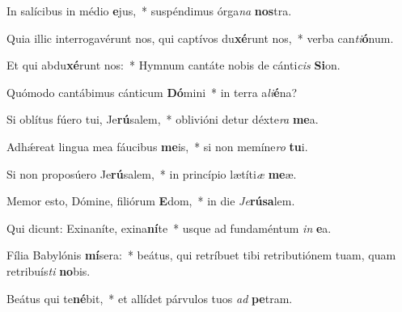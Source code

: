 \item In salícibus in médio \textbf{e}jus,~* suspéndimus órga\textit{na} \textbf{nos}tra.
\item Quia illic interrogavérunt nos, qui captívos du\textbf{xé}runt nos,~* verba can\textit{ti}\textbf{ó}num.
\item Et qui abdu\textbf{xé}runt nos:~* Hymnum cantáte nobis de cánti\textit{cis} \textbf{Si}on.
\item Quómodo cantábimus cánticum \textbf{Dó}mini~* in terra a\textit{li}\textbf{é}na?
\item Si oblítus fúero tui, Je\textbf{rú}salem,~* oblivióni detur déxte\textit{ra} \textbf{me}a.
\item Adhǽreat lingua mea fáucibus \textbf{me}is,~* si non memíne\textit{ro} \textbf{tu}i.
\item Si non proposúero Je\textbf{rú}salem,~* in princípio lætíti\textit{æ} \textbf{me}æ.
\item Memor esto, Dómine, filiórum \textbf{E}dom,~* in die \textit{Je}\textbf{rú}\textbf{sa}lem.
\item Qui dicunt: Exinaníte, exina\textbf{ní}te~* usque ad fundaméntum \textit{in} \textbf{e}a.
\item Fília Babylónis \textbf{mí}sera:~* beátus, qui retríbuet tibi retributiónem tuam, quam retribuís\textit{ti} \textbf{no}bis.
\item Beátus qui te\textbf{né}bit,~* et allídet párvulos tuos \textit{ad} \textbf{pe}tram.
